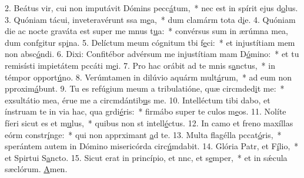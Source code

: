 2. Beátus vir, cui non imputávit Dómins pecc\uline{á}tum,~* nec est in spírit ejus d\uline{o}lus.
3. Quóniam tácui, inveteravérunt ssa m\uline{e}a,~* dum clamárm tota d\uline{i}e.
4. Quóniam die ac nocte graváta est super me mnus t\uline{u}a:~* convérsus sum in ærúmna mea, dum confgitur sp\uline{i}na.
5. Delíctum meum cógnitum tbi f\uline{e}ci:~* et injustítiam mem non absc\uline{ó}ndi.
6. Dixi: Confitébor advérsum me injustítiam mam D\uline{ó}mino:~* et tu remisísti impietátem pccáti m\uline{e}i.
7. Pro hac orábit ad te mnis s\uline{a}nctus,~* in témpor opport\uline{ú}no.
8. Verúmtamen in dilúvio aquárm mult\uline{á}rum,~* ad eum non pproxim\uline{á}bunt.
9. Tu es refúgium meum a tribulatióne, quæ circmded\uline{i}t me:~* exsultátio mea, érue me a circmdántib\uline{u}s me.
10. Intelléctum tibi dabo, et ínstruam te in via hac, qua grdi\uline{é}ris:~* firmábo super te culos m\uline{e}os.
11. Nolíte fíeri sicut es et m\uline{u}lus,~* quibus non st intell\uline{é}ctus.
12. In camo et freno maxíllas eórm constr\uline{í}nge:~* qui non apprximant \uline{a}d te.
13. Multa flagélla pccat\uline{ó}ris,~* sperántem autem in Dómino misericórda circ\uline{ú}mdabit.
14. Glória Patr, et F\uline{í}lio,~* et Spirtui S\uline{a}ncto.
15. Sicut erat in princípio, et nnc, et s\uline{e}mper,~* et in sǽcula sæclórum. \uline{A}men.
